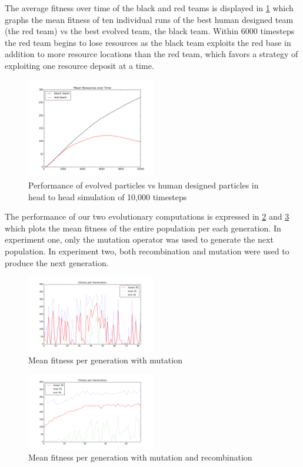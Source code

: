 \documentclass[12pt,journal,compsoc]{IEEEtran}
\begin{document}
The average fitness over time of the black and red teams is displayed in \ref{fig:head2head} which graphs the mean fitness of ten individual runs of the best human designed team (the red team) vs the best evolved team, the black team. Within 6000 timesteps the red team begins to lose resources as the black team exploits the red base in addition to more resource locations than the red team, which favors a strategy of exploiting one resource deposit at a time.

\begin{figure}[ht!]
    \centering
        \includegraphics[width=0.5\textwidth]{figures/head2head}
    \caption{Performance of evolved particles vs human designed particles in head to head simulation of 10,000 timesteps}
    \label{fig:head2head}
\end{figure}

The performance of our two evolutionary computations is expressed in \ref{fig:meanfit1} and \ref{fig:meanfit2} which plots the mean fitness of the entire population per each generation. In experiment one, only the mutation operator was used to generate the next population. In experiment two, both recombination and mutation were used to produce the next generation.

\begin{figure}[ht!]
    \centering
        \includegraphics[width=0.5\textwidth]{figures/meanfit_experiment1}
    \caption{Mean fitness per generation with mutation}
    \label{fig:meanfit1}
\end{figure}

\begin{figure}[ht!]
    \centering
        \includegraphics[width=0.5\textwidth]{figures/fitness46}
    \caption{Mean fitness per generation with mutation and recombination}
    \label{fig:meanfit2}
\end{figure}
\end{document}
